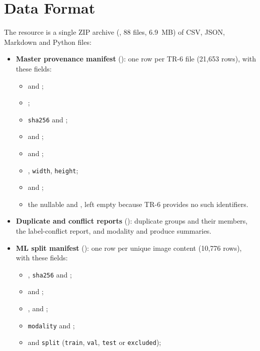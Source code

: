 \documentclass[journal]{IEEEtran}
\begin{document}
\section{Data Format}
The resource is a single ZIP archive (, 88 files, 6.9~MB) of CSV, JSON, Markdown and Python files:
\begin{itemize}
  \item \textbf{Master provenance manifest} (): one row per TR-6 file (21,653 rows), with these fields:
  \begin{itemize}
    \item[--]  and ;
    \item[--] ;
    \item[--] \texttt{sha256} and ;
    \item[--]  and ;
    \item[--]  and ;
    \item[--] , \texttt{width}, \texttt{height};
    \item[--]  and ;
    \item[--] the nullable  and , left empty because TR-6 provides no such identifiers.
  \end{itemize}
  \item \textbf{Duplicate and conflict reports} (): duplicate groups and their members, the label-conflict report, and modality and produce summaries.
  \item \textbf{ML split manifest} (): one row per unique image content (10,776 rows), with these fields:
  \begin{itemize}
    \item[--] , \texttt{sha256} and ;
    \item[--]  and ;
    \item[--] ,  and ;
    \item[--] \texttt{modality} and ;
    \item[--]  and \texttt{split} (\texttt{train}, \texttt{val}, \texttt{test} or \texttt{excluded});

\end{itemize}
\end{itemize}
\end{document}
